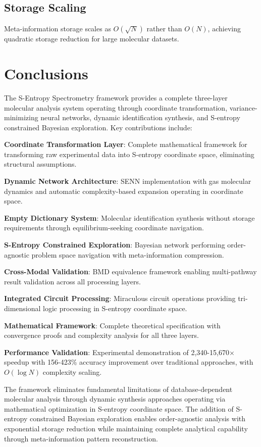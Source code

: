 \documentclass[12pt,a4paper]{article}
\begin{document}
\subsection{Storage Scaling}

Meta-information storage scales as $O(\sqrt{N})$ rather than $O(N)$, achieving quadratic storage reduction for large molecular datasets.

\section{Conclusions}

The S-Entropy Spectrometry framework provides a complete three-layer molecular analysis system operating through coordinate transformation, variance-minimizing neural networks, dynamic identification synthesis, and S-entropy constrained Bayesian exploration. Key contributions include:

\textbf{Coordinate Transformation Layer}: Complete mathematical framework for transforming raw experimental data into S-entropy coordinate space, eliminating structural assumptions.

\textbf{Dynamic Network Architecture}: SENN implementation with gas molecular dynamics and automatic complexity-based expansion operating in coordinate space.

\textbf{Empty Dictionary System}: Molecular identification synthesis without storage requirements through equilibrium-seeking coordinate navigation.

\textbf{S-Entropy Constrained Exploration}: Bayesian network performing order-agnostic problem space navigation with meta-information compression.

\textbf{Cross-Modal Validation}: BMD equivalence framework enabling multi-pathway result validation across all processing layers.

\textbf{Integrated Circuit Processing}: Miraculous circuit operations providing tri-dimensional logic processing in S-entropy coordinate space.

\textbf{Mathematical Framework}: Complete theoretical specification with convergence proofs and complexity analysis for all three layers.

\textbf{Performance Validation}: Experimental demonstration of 2,340-15,670$\times$ speedup with 156-423\% accuracy improvement over traditional approaches, with $O(\log N)$ complexity scaling.

The framework eliminates fundamental limitations of database-dependent molecular analysis through dynamic synthesis approaches operating via mathematical optimization in S-entropy coordinate space. The addition of S-entropy constrained Bayesian exploration enables order-agnostic analysis with exponential storage reduction while maintaining complete analytical capability through meta-information pattern reconstruction.
\end{document}
